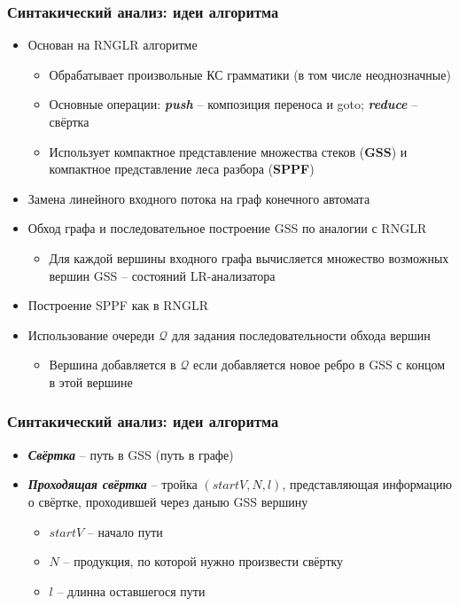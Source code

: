 \documentclass{beamer}
\begin{document}
\begin{frame}
    \transwipe[direction=90]
    \frametitle{Синтакический анализ: идеи алгоритма}
    \begin{itemize}         
        \item Основан на RNGLR алгоритме
        \begin{itemize}         
           \item Обрабатывает произвольные КС грамматики (в том числе неоднозначные)
           \item Основные операции: {\bfseries{\textit{push}}} -- композиция переноса и goto; {\bfseries{\textit{reduce}}} -- свёртка
           \item Использует компактное представление множества стеков ({\bfseries GSS}) и компактное представление леса разбора ({\bfseries SPPF})
        \end{itemize}
        \item Замена линейного входного потока на граф конечного автомата
        \item Обход графа и последовательное построение GSS по аналогии с RNGLR
            \begin{itemize}         
                \item Для каждой вершины входного графа вычисляется множество возможных вершин GSS -- состояний LR-анализатора
            \end{itemize}
        \item Построение SPPF как в RNGLR
        \item Использование очереди $\mathcal Q$ для задания последовательности обхода вершин
            \begin{itemize}         
                \item Вершина добавляется в $\mathcal Q$ если добавляется новое ребро в GSS с концом в этой вершине
            \end{itemize}
    \end{itemize}
\end{frame}

\begin{frame}
    \transwipe[direction=90]
    \frametitle{Синтакический анализ: идеи алгоритма}
    \begin{itemize}         
         \item {\bfseries{\textit{Свёртка}}} -- путь в GSS (путь в графе)
         \item {\bfseries{\textit{Проходящая свёртка}}} -- тройка $(startV, N, l)$, представляющая информацию о свёртке, проходившей через даныю GSS вершину
         \begin{itemize}         
                \item $startV$ -- начало пути
        \item $N$ -- продукция, по которой нужно произвести свёртку
        \item $l$ -- длинна оставшегося пути
         \end{itemize}
    \end{itemize}
\end{frame}
\end{document}
